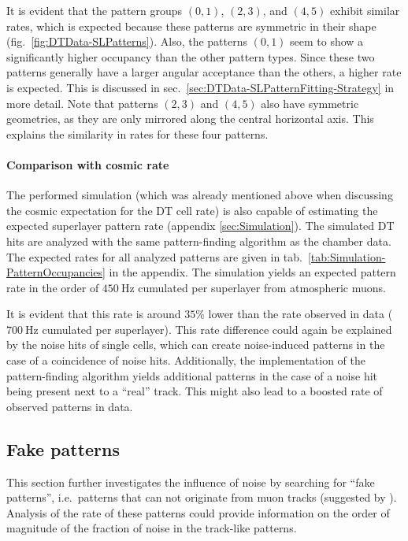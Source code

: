 \par It is evident that the pattern groups $(0,1)$, $(2,3)$, and $(4,5)$ exhibit similar rates, which is expected because these patterns are symmetric in their shape (fig.\ \ref{fig:DTData-SLPatterns}). Also, the patterns $(0,1)$ seem to show a significantly higher occupancy than the other pattern types. Since these two patterns generally have a larger angular acceptance than the others, a higher rate is expected. This is discussed in sec.\ \ref{sec:DTData-SLPatternFitting-Strategy} in more detail. Note that patterns $(2,3)$ and $(4,5)$ also have symmetric geometries, as they are only mirrored along the central horizontal axis. This explains the similarity in rates for these four patterns.
\paragraph{Comparison with cosmic rate}
The performed simulation (which was already mentioned above when discussing the cosmic expectation for the \ac{DT} cell rate) is also capable of estimating the expected superlayer pattern rate (appendix \ref{sec:Simulation}). The simulated \ac{DT} hits are analyzed with the same pattern-finding algorithm as the chamber data. The expected rates for all analyzed patterns are given in tab.\ \ref{tab:Simulation-PatternOccupancies} in the appendix. The simulation yields an expected pattern rate in the order of $\SI{450}{\hertz}$ cumulated per superlayer from atmospheric muons.
\par It is evident that this rate is around $35\%$ lower than the rate observed in data ($\SI{700}{\hertz}$ cumulated per superlayer). This rate difference could again be explained by the noise hits of single cells, which can create noise-induced patterns in the case of a coincidence of noise hits. Additionally, the implementation of the pattern-finding algorithm yields additional patterns in the case of a noise hit being present next to a \enquote{real} track. This might also lead to a boosted rate of observed patterns in data.

\subsection{Fake patterns}
\label{sec:DTData-SLHitPatterns-FakePatterns}
This section further investigates the influence of noise by searching for \enquote{fake patterns}, i.e.\ patterns that can not originate from muon tracks (suggested by \cite{PrivateComm-Hebbeker}). Analysis of the rate of these patterns could provide information on the order of magnitude of the fraction of noise in the track-like patterns.
